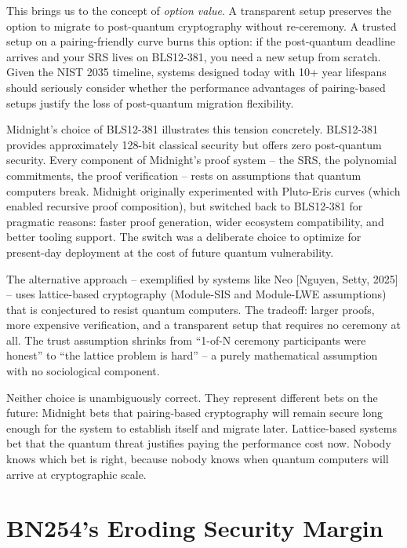 \documentclass[
  11pt,
  openany]{report}
\begin{document}
This brings us to the concept of \emph{option value}. A transparent setup
preserves the option to migrate to post-quantum cryptography without
re-ceremony. A trusted setup on a pairing-friendly curve burns this option: if
the post-quantum deadline arrives and your SRS lives on BLS12-381, you need a
new setup from scratch. Given the NIST 2035 timeline, systems designed today
with 10+ year lifespans should seriously consider whether the performance
advantages of pairing-based setups justify the loss of post-quantum migration
flexibility.

Midnight's choice of BLS12-381 illustrates this tension concretely. BLS12-381
provides approximately 128-bit classical security but offers zero post-quantum
security. Every component of Midnight's proof system -- the SRS, the polynomial
commitments, the proof verification -- rests on assumptions that quantum
computers break. Midnight originally experimented with Pluto-Eris curves (which
enabled recursive proof composition), but switched back to BLS12-381 for
pragmatic reasons: faster proof generation, wider ecosystem compatibility, and
better tooling support. The switch was a deliberate choice to optimize for
present-day deployment at the cost of future quantum vulnerability.

The alternative approach -- exemplified by systems like Neo {[}Nguyen, Setty,
2025{]} -- uses lattice-based cryptography (Module-SIS and Module-LWE
assumptions) that is conjectured to resist quantum computers. The tradeoff:
larger proofs, more expensive verification, and a transparent setup that
requires no ceremony at all. The trust assumption shrinks from ``1-of-N ceremony
participants were honest'' to ``the lattice problem is hard'' -- a purely
mathematical assumption with no sociological component.

Neither choice is unambiguously correct. They represent different bets on the
future: Midnight bets that pairing-based cryptography will remain secure long
enough for the system to establish itself and migrate later. Lattice-based
systems bet that the quantum threat justifies paying the performance cost now.
Nobody knows which bet is right, because nobody knows when quantum computers
will arrive at cryptographic scale.

\section{BN254's Eroding Security Margin}\label{bn254s-eroding-security-margin}
\end{document}
